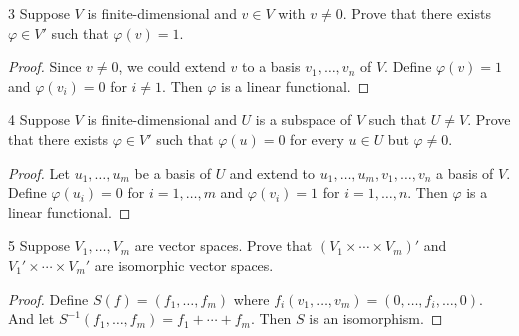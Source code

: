 \documentclass{article}
\newenvironment{problem}[1]{\begin{prob*}{#1}{}}{\end{prob*}}
\begin{document}
\newpage
\begin{problem}{3}
Suppose $V $ is finite-dimensional and $v \in V$ with $v \neq 0.$ Prove that there exists $\varphi \in V'$ such that $\varphi(v) = 1$.
\end{problem}
\begin{proof}
	Since $v \neq 0$, we could extend $v$ to a basis $v_1, \ldots ,v_n$ of $V$. Define $\varphi(v) = 1$ and $\varphi(v_i) = 0$ for $i \neq 1$. Then $\varphi$ is a linear functional.
\end{proof}

\begin{problem}{4}
Suppose $V $ is finite-dimensional and $U$ is a subspace of $V$ such that $U \neq V$. Prove that there exists $\varphi \in V'$ such that $\varphi(u) = 0$ for every $u \in U$ but $\varphi \neq 0$.
\end{problem}
\begin{proof}
	Let $u_1, \ldots , u_m$ be a basis of $U$ and extend to $u_1, \ldots, u_m, v_1, \ldots , v_n$ a basis of $V$. Define $\varphi(u_i) = 0$ for $i = 1, \ldots , m$ and $\varphi(v_i) = 1$ for $i = 1, \ldots , n$. Then $\varphi$ is a linear functional.
\end{proof}

\begin{problem}{5}
Suppose $V_1 , \ldots , V_m$ are vector spaces. Prove that $(V_1 \times \cdots\times V_m)'$ and $V_1' \times  \cdots \times V_m'$ are isomorphic vector spaces.
\end{problem}
\begin{proof}
	Define $S(f) = (f_1, \ldots , f_m)$ where $f_i(v_1, \ldots ,v_m) = (0, \ldots , f_i, \ldots ,0)$. And let $S^{-1} (f_1, \ldots ,f_m)= f_1 + \cdots + f_m$. Then $S$ is an isomorphism.
\end{proof}
\end{document}
